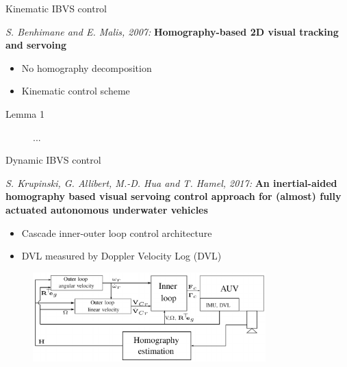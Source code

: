 \documentclass{beamer}
\begin{document}
\begin{frame}{Kinematic IBVS control}
\begin{block}{\textit{S. Benhimane and E. Malis, 2007:}}
\textbf{Homography-based 2D visual tracking and servoing}
\begin{itemize}
	\item No homography decomposition 
	\item Kinematic control scheme
\end{itemize}	
\end{block}


	


\begin{block}{Lemma 1}
	\begin{figure}[ht!]	
			...
	\end{figure}
\end{block}

 
\end{frame}

%
%



\begin{frame}{Dynamic IBVS control}

\begin{block}{\textit{S. Krupinski, G. Allibert, M.-D. Hua and T. Hamel, 2017:}}
	\textbf{An inertial-aided homography based visual servoing control approach for (almost) fully actuated autonomous underwater vehicles}
	\begin{itemize}
		\item Cascade inner-outer loop control architecture
		\item DVL measured by Doppler Velocity Log (DVL)
	\end{itemize}
\end{block}

\begin{figure}
	\includegraphics[width = 90mm]{Images/Block_diagram_1.png}
\end{figure}

\end{frame}
\end{document}
